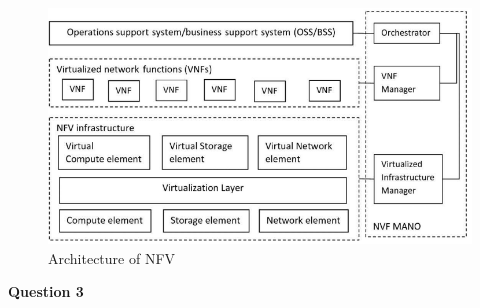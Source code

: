 \documentclass[a4paper, 12pt]{article}
\begin{document}
\begin{figure}[H]
	\centering
	\includegraphics[width=\linewidth]{nfv.png}
  	\caption{Architecture of NFV}
	\label{fig:nfv}
\end{figure}


\newpage
\begin{center}
\textbf{Question 3}
\end{center}
\end{document}
